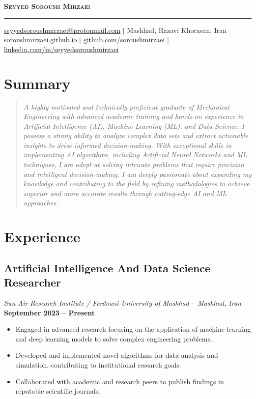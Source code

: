 \documentclass[10pt, a4paper]{article}
\makeatletter
\newcommand{\makecvheader}{
    \begin{center}
        {\Huge \bfseries \scshape Seyyed Soroush Mirzaei} \\ \vspace{3mm}
        \hrule \vspace{2.5mm}
        \href{mailto:seyyedsoroushmirzaei@protonmail.com}{seyyedsoroushmirzaei@protonmail.com} $|$
        Mashhad, Razavi Khorasan, Iran \\
        \href{https://soroushmirzaei.github.io}{soroushmirzaei.github.io} $|$
        \href{https://github.com/soroushmirzaei}{github.com/soroushmirzaei} $|$
        \href{https://www.linkedin.com/in/seyyedsoroushmirzaei}{linkedin.com/in/seyyedsoroushmirzaei}
    \end{center}
    \vspace{6mm}
}
\makeatother
\begin{document}
\makecvheader


\section*{Summary}
\begin{quote}
\itshape A highly motivated and technically proficient graduate of Mechanical Engineering with advanced academic training and hands-on experience in Artificial Intelligence (AI), Machine Learning (ML), and Data Science. I possess a strong ability to analyze complex data sets and extract actionable insights to drive informed decision-making. With exceptional skills in implementing AI algorithms, including Artificial Neural Networks and ML techniques, I am adept at solving intricate problems that require precision and intelligent decision-making. I am deeply passionate about expanding my knowledge and contributing to the field by refining methodologies to achieve superior and more accurate results through cutting-edge AI and ML approaches.
\end{quote}


\section{Experience}
\subsection{Artificial Intelligence And Data Science Researcher}
\textit{Sun Air Research Institute / Ferdowsi University of Mashhad -- Mashhad, Iran} \hfill \textbf{September 2023 -- Present}
\begin{itemize}[leftmargin=1.5em, noitemsep, topsep=0.5ex]
    \item Engaged in advanced research focusing on the application of machine learning and deep learning models to solve complex engineering problems.
    \item Developed and implemented novel algorithms for data analysis and simulation, contributing to institutional research goals.
    \item Collaborated with academic and research peers to publish findings in reputable scientific journals.
\end{itemize}
\end{document}
